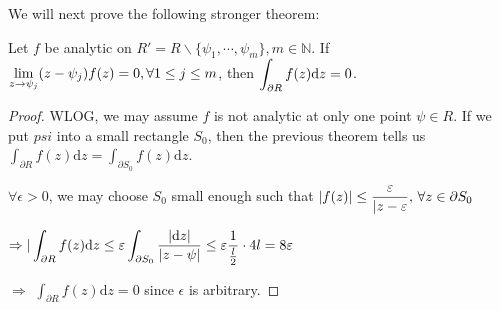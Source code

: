  We will next prove the following stronger theorem:
\begin{theorem}\label{stronger version of Cauchy's theorem for a rectangle}
    Let  $ f $ be analytic on  $ R'=R\backslash\{\psi_1,\cdots,\psi_m\}, m\in \mathbb{N} $. If  $ \displaystyle\lim\limits_{z\to\psi_j}(z-\psi_j)f(z)=0,\forall 1 \leq j \leq m $, then  $ \displaystyle\int_{\partial R}f(z)\mathrm{d}z=0 $.    
\end{theorem}
\begin{proof}
    WLOG, we may assume  $ f $ is not analytic at only one point  $ \psi\in R $. If we put  $ psi  $ into a small rectangle $ S_0 $, then the previous theorem tells us  $ \int_{
        \partial R
    }f(z)\mathrm{d}z=\int_{\partial S_0}f(z)\mathrm{d}z $.
    
     $ \forall \epsilon>0 $, we may choose  $ S_0 $ small enough such that  $ |f(z)| \leq \displaystyle\frac{\varepsilon}{|z-\varepsilon},\,\forall z\in\partial S_0 $
     
      $\displaystyle \Rightarrow|\int_{\partial R}f(z)\mathrm{d}z \leq \varepsilon \int_{\partial S_0}\frac{|\mathrm{d}z|}{|z-\psi|} \leq \varepsilon \frac{1}{\frac{l}{2}}\cdot 4l=8\varepsilon $ 
      
       $ \Rightarrow $ $ \int_{\partial R}f(z)\mathrm{d}z=0 $ since  $ \epsilon $ is arbitrary.   
\end{proof}

